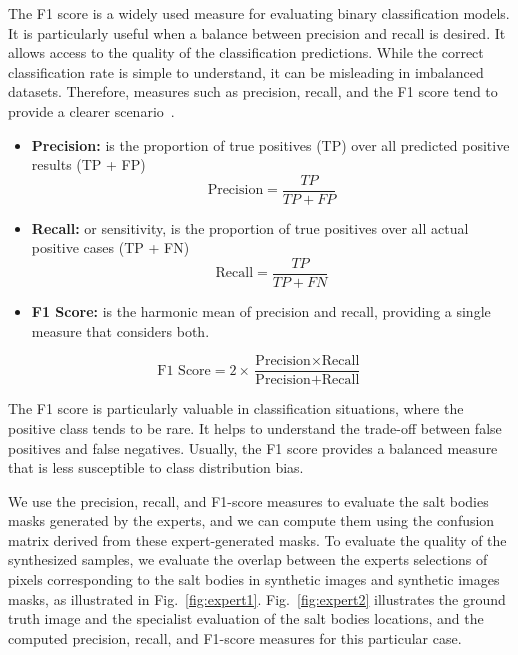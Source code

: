 \documentclass{ieeeaccess}
\begin{document}
The F1 score is a widely used measure for evaluating binary classification models. It is particularly useful when a balance between precision and recall is desired. It allows access to the quality of the classification predictions. While the correct classification rate is simple to understand, it can be misleading in imbalanced datasets. Therefore, measures such as precision, recall, and the F1 score tend to provide a clearer scenario~\cite{Powers2011}.

\begin{itemize}
    \item \textbf{Precision:} is the proportion of true positives (TP) over all predicted positive results (TP + FP)
    \begin{equation}
    \text{Precision} = \frac{TP}{TP + FP}
    \end{equation}

    \item \textbf{Recall:} or sensitivity, is the proportion of true positives over all actual positive cases (TP + FN)
    \begin{equation}
    \text{Recall} = \frac{TP}{TP + FN}
    \end{equation}

    \item \textbf{F1 Score:} is the harmonic mean of precision and recall, providing a single measure that considers both. 

\end{itemize}
    \begin{equation}
    \text{F1 Score} = 2 \times \frac{\text{Precision} \times \text{Recall}}{\text{Precision} + \text{Recall}}
    \end{equation}

The F1 score is particularly valuable in classification situations, where the positive class tends to be rare. It helps to understand the trade-off between false positives and false negatives. Usually, the F1 score provides a balanced measure that is less susceptible to class distribution bias.

We use the precision, recall, and F1-score measures to evaluate the salt bodies masks generated by the experts, and we can compute them using the confusion matrix derived from these expert-generated masks. To evaluate the quality of the synthesized samples, we evaluate the overlap between the experts selections of pixels corresponding to the salt bodies in synthetic images and synthetic images masks, as illustrated in Fig.~\ref{fig:expert1}. Fig.~\ref{fig:expert2} illustrates the ground truth image and the specialist evaluation of the salt bodies locations, and the computed precision, recall, and F1-score measures for this particular case.
\end{document}
